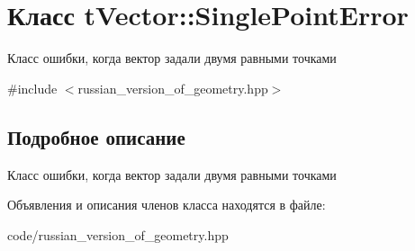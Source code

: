 \hypertarget{classtVector_1_1SinglePointError}{}\section{Класс t\+Vector\+:\+:Single\+Point\+Error}
\label{classtVector_1_1SinglePointError}


Класс ошибки, когда вектор задали двумя равными точками  




{\ttfamily \#include $<$russian\+\_\+version\+\_\+of\+\_\+geometry.\+hpp$>$}



\subsection{Подробное описание}
Класс ошибки, когда вектор задали двумя равными точками 

Объявления и описания членов класса находятся в файле\+:\begin{DoxyCompactItemize}
\item 
code/russian\+\_\+version\+\_\+of\+\_\+geometry.\+hpp\end{DoxyCompactItemize}
